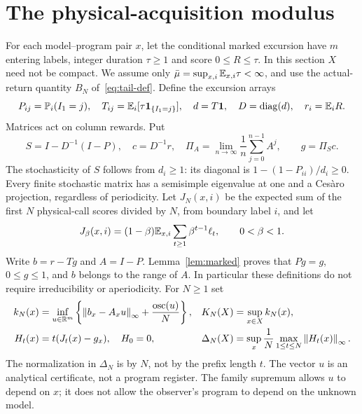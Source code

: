 \section{The physical-acquisition modulus}\label{sec:modulus}
For each model--program pair $x$, let the conditional marked excursion have $m$ entering labels, integer duration $\tau\ge1$ and score $0\le R\le\tau$. In this section $X$ need not be compact. We assume only $\bar\mu=\sup_{x,i}\mathbb E_{x,i}\tau<\infty$, and use the actual-return quantity $B_N$ of~\eqref{eq:tail-def}. Define the excursion arrays
\begin{equation}\label{eq:arrays}
 P_{ij}=\mathbb P_i(I_1=j),\quad T_{ij}=\mathbb E_i[\tau\mathbf 1_{\{I_1=j\}}],\quad
 d=T\mathbf 1,\quad D=\operatorname{diag}(d),\quad r_i=\mathbb E_iR.
\end{equation}
Matrices act on column rewards. Put
\begin{equation}\label{eq:time-change}
 S=I-D^{-1}(I-P),\quad c=D^{-1}r,\quad
 \Pi_A=\lim_{n\to\infty}\frac1n\sum_{j=0}^{n-1}A^j,
 \qquad g=\Pi_Sc.
\end{equation}
The stochasticity of $S$ follows from $d_i\ge1$: its diagonal is $1-(1-P_{ii})/d_i\ge0$. Every finite stochastic matrix has a semisimple eigenvalue at one and a Ces\`aro projection, regardless of periodicity. Let $J_N(x,i)$ be the expected sum of the first $N$ physical-call scores divided by $N$, from boundary label $i$, and let
\[
 J_\beta(x,i)=(1-\beta)\mathbb E_{x,i}\sum_{t\ge1}\beta^{t-1}\ell_t,
 \qquad 0<\beta<1.
\]
Write $b=r-Tg$ and $A=I-P$. Lemma~\ref{lem:marked} proves that $Pg=g$, $0\le g\le1$, and $b$ belongs to the range of $A$. In particular these definitions do not require irreducibility or aperiodicity. For $N\ge1$ set
\begin{align}
 k_N(x)&=\inf_{u\in\mathbb R^m}\left\{\left\lVert b_x-A_xu\right\rVert_\infty+\frac{\operatorname{osc}(u)}N\right\},
 & K_N(X)&=\sup_{x\in X}k_N(x),\label{eq:modulus-primal}\\
 H_t(x)&=t(J_t(x)-g_x),\quad H_0=0,
 &\Delta_N(X)&=\sup_x\frac1N\max_{1\le t\le N}\left\lVert H_t(x)\right\rVert_\infty.\label{eq:prefix-modulus}
\end{align}
The normalization in $\Delta_N$ is by $N$, not by the prefix length $t$. The vector $u$ is an analytical certificate, not a program register. The family supremum allows $u$ to depend on $x$; it does not allow the observer's program to depend on the unknown model.

